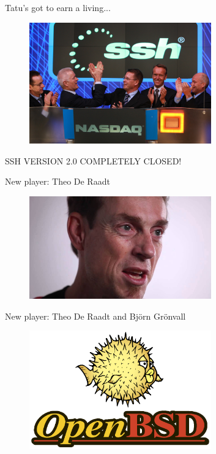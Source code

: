 \documentclass[10pt, compress, aspectratio=169]{beamer}
\begin{document}
\begin{frame}{Tatu's got to earn a living...}
  \pause
  \begin{figure}[ht]
    \centering
    \includegraphics[width=0.7\textwidth, keepaspectratio=true]{images/ssh.jpg}
  \end{figure}
  \pause
  SSH VERSION 2.0 COMPLETELY CLOSED!
\end{frame}

\begin{frame}{New player: Theo De Raadt}
  \begin{figure}[ht]
    \centering
    \includegraphics[width=0.7\textwidth, keepaspectratio=true]{images/theoDeRaadt.jpg}
  \end{figure}
\end{frame}

\begin{frame}{New player: Theo De Raadt and Björn Grönvall}
  \begin{figure}[ht]
    \centering
    \includegraphics[width=0.7\textwidth, keepaspectratio=true]{images/openbsd.png}
  \end{figure}
\end{frame}
\end{document}
